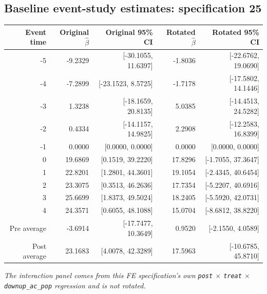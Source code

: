 \documentclass[10pt]{article}
\begin{document}
\subsection*{Baseline event-study estimates: specification 25}
\begin{center}
\scriptsize
\begin{tabular}{r rr rr}
\toprule
Event time & Original $\hat\beta$ & Original 95\% CI & Rotated $\hat\beta$ & Rotated 95\% CI \\
\midrule
-5 & -9.2329 & [-30.1055, 11.6397] & -1.8036 & [-22.6762, 19.0690] \\
-4 & -7.2899 & [-23.1523, 8.5725] & -1.7178 & [-17.5802, 14.1446] \\
-3 & 1.3238 & [-18.1659, 20.8135] & 5.0385 & [-14.4513, 24.5282] \\
-2 & 0.4334 & [-14.1157, 14.9825] & 2.2908 & [-12.2583, 16.8399] \\
-1 & 0.0000 & [0.0000, 0.0000] & 0.0000 & [0.0000, 0.0000] \\
0 & 19.6869 & [0.1519, 39.2220] & 17.8296 & [-1.7055, 37.3647] \\
1 & 22.8201 & [1.2801, 44.3601] & 19.1054 & [-2.4345, 40.6454] \\
2 & 23.3075 & [0.3513, 46.2636] & 17.7354 & [-5.2207, 40.6916] \\
3 & 25.6699 & [1.8373, 49.5024] & 18.2405 & [-5.5920, 42.0731] \\
4 & 24.3571 & [0.6055, 48.1088] & 15.0704 & [-8.6812, 38.8220] \\
\midrule
Pre average & -3.6914 & [-17.7477, 10.3649] & 0.9520 & [-2.1550, 4.0589] \\
Post average & 23.1683 & [4.0078, 42.3289] & 17.5963 & [-10.6785, 45.8710] \\
\bottomrule
\end{tabular}
\end{center}
\medskip
\textit{The interaction panel comes from this FE specification's own \texttt{post} $\times$ \texttt{treat} $\times$ \texttt{downup\_ac\_pop} regression and is not rotated.}
\clearpage
\end{document}
